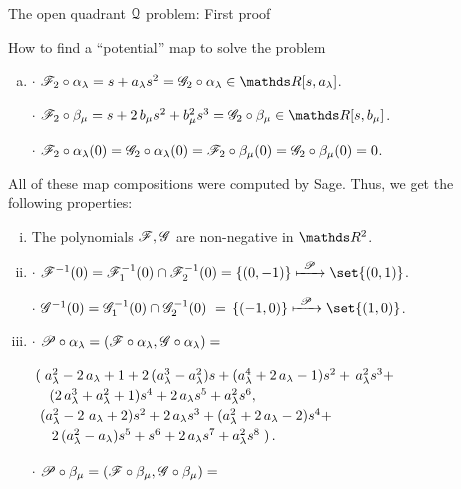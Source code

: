 \documentclass[11pt, a4paper, english, twoside, notitlepage, openright]{report}
\begin{document}
\begin{chapter}{The open quadrant $\mathcal{Q}$ problem: First proof}
\begin{section}{How to find a ``potential'' map to solve the problem}
\begin{enumerate}[(a)]
\item $\cdot$ $\F_2\circ\alpha_{\lambda }= s+a_{\lambda} s^{2} = \G_2\circ\alpha_{\lambda}\in\R[s,a_{\lambda }]$.
			
$\cdot$ $\F_2\circ\beta_{\mu}= s+2 \, b_{\mu} s^{2}+b_{\mu}^{2} s^{3} = \G_2\circ\beta_{\mu}\in\R[s,b_{\mu}]$.
				
$\cdot$ $\mathscr{F}_2\circ\alpha_{\lambda }(0)=\mathscr{G}_2\circ\alpha_{\lambda}(0)=\mathscr{F}_2\circ\beta_{\mu}(0)=\mathscr{G}_2\circ\beta_{\mu}(0)=0$.
\end{enumerate}
All of these map compositions were computed by Sage. Thus, we get the following properties:
		
\begin{enumerate}[(i)]
		
\item The polynomials $\mathscr{F},\mathscr{G}$ are non-negative in $\R^2$.
		
\item $\cdot$ $\F^{-1}(0)=\F_1^{-1}(0)\cap \F_2^{-1}(0)=\{(0,-1)\}\xmapsto{\ \P\ }\set{(0,1)}$.
			
$\cdot$ $\G^{-1}(0)=\G_1^{-1}(0)\cap \G_2^{-1}(0)\ =\, \{(-1,0)\} \xmapsto{\ \P\ } \set{(1,0)}$.
		
\item $\cdot$ $\mathscr{P}\circ\alpha_{\lambda}=(\mathscr{F}\circ\alpha_{\lambda },\mathscr{G}\circ\alpha_{\lambda})=$
			
$\arraycolsep=2pt\def\arraystretch{1.2}
\begin{array}{l}
\left(\right.a_{\lambda}^{2}-2 \,a_{\lambda}+1+2 \,{(a_{\lambda}^{3}-a_{\lambda}^{2})}s+{(a_{\lambda}^{4}+2 \, a_{\lambda}-1)} s^{2}+ \,a_{\lambda}^{2} s^{3}+\\
\quad {(2\, a_{\lambda}^{3}+a_{\lambda}^{2}+1)}s^{4}+2 \,a_{\lambda} s^{5}+a_{\lambda}^{2} s^{6},\\		
\ {(a_{\lambda}^{2}-2 \ a_{\lambda}+2)} s^{2}+2 \, a_{\lambda} s^{3}+{(a_{\lambda}^{2}+2 \,a_{\lambda}-2)}s^{4}+\\
\quad \,2 \,{(a_{\lambda}^{2}-a_{\lambda})}s^{5}+s^{6}+2\,a_{\lambda} s^{7}+a_{\lambda}^{2}s^{8}\left.\right).
\end{array}
$
				
$\cdot$ $\mathscr{P}\circ\beta_{\mu}=(\mathscr{F}\circ\beta_{\mu},\mathscr{G}\circ\beta_{\mu})=
$
				

\end{enumerate}
\end{section}
\end{chapter}
\end{document}
